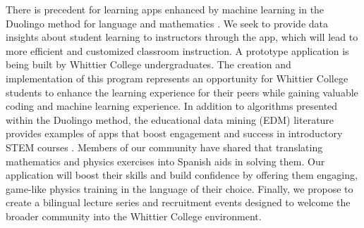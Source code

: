 \documentclass[../../main.tex]{subfiles}
\begin{document}
There is precedent for learning apps enhanced by machine learning in the Duolingo method for language and mathematics \cite{duolingo_whitepaper}. We seek to provide data insights about student learning to instructors through the app, which will lead to more efficient and customized classroom instruction.  A prototype application is being built by Whittier College undergraduates.  The creation and implementation of this program represents an opportunity for Whittier College students to enhance the learning experience for their peers while gaining valuable coding and machine learning experience.  In addition to algorithms presented within the Duolingo method, the educational data mining (EDM) literature provides examples of apps that boost engagement and success in introductory STEM courses \cite{edm1,edm2,edm3,edm4}.  Members of our community have shared that translating mathematics and physics exercises into Spanish aids in solving them.  Our application will boost their skills and build confidence by offering them engaging, game-like physics training in the language of their choice.  Finally, we propose to create a bilingual lecture series and recruitment events designed to welcome the broader community into the Whittier College environment.

\clearpage
\end{document}
